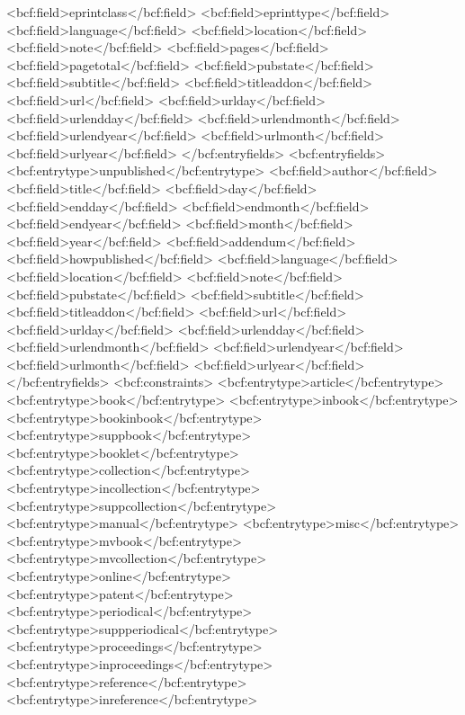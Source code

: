       <bcf:field>eprintclass</bcf:field>
      <bcf:field>eprinttype</bcf:field>
      <bcf:field>language</bcf:field>
      <bcf:field>location</bcf:field>
      <bcf:field>note</bcf:field>
      <bcf:field>pages</bcf:field>
      <bcf:field>pagetotal</bcf:field>
      <bcf:field>pubstate</bcf:field>
      <bcf:field>subtitle</bcf:field>
      <bcf:field>titleaddon</bcf:field>
      <bcf:field>url</bcf:field>
      <bcf:field>urlday</bcf:field>
      <bcf:field>urlendday</bcf:field>
      <bcf:field>urlendmonth</bcf:field>
      <bcf:field>urlendyear</bcf:field>
      <bcf:field>urlmonth</bcf:field>
      <bcf:field>urlyear</bcf:field>
    </bcf:entryfields>
    <bcf:entryfields>
      <bcf:entrytype>unpublished</bcf:entrytype>
      <bcf:field>author</bcf:field>
      <bcf:field>title</bcf:field>
      <bcf:field>day</bcf:field>
      <bcf:field>endday</bcf:field>
      <bcf:field>endmonth</bcf:field>
      <bcf:field>endyear</bcf:field>
      <bcf:field>month</bcf:field>
      <bcf:field>year</bcf:field>
      <bcf:field>addendum</bcf:field>
      <bcf:field>howpublished</bcf:field>
      <bcf:field>language</bcf:field>
      <bcf:field>location</bcf:field>
      <bcf:field>note</bcf:field>
      <bcf:field>pubstate</bcf:field>
      <bcf:field>subtitle</bcf:field>
      <bcf:field>titleaddon</bcf:field>
      <bcf:field>url</bcf:field>
      <bcf:field>urlday</bcf:field>
      <bcf:field>urlendday</bcf:field>
      <bcf:field>urlendmonth</bcf:field>
      <bcf:field>urlendyear</bcf:field>
      <bcf:field>urlmonth</bcf:field>
      <bcf:field>urlyear</bcf:field>
    </bcf:entryfields>
    <bcf:constraints>
      <bcf:entrytype>article</bcf:entrytype>
      <bcf:entrytype>book</bcf:entrytype>
      <bcf:entrytype>inbook</bcf:entrytype>
      <bcf:entrytype>bookinbook</bcf:entrytype>
      <bcf:entrytype>suppbook</bcf:entrytype>
      <bcf:entrytype>booklet</bcf:entrytype>
      <bcf:entrytype>collection</bcf:entrytype>
      <bcf:entrytype>incollection</bcf:entrytype>
      <bcf:entrytype>suppcollection</bcf:entrytype>
      <bcf:entrytype>manual</bcf:entrytype>
      <bcf:entrytype>misc</bcf:entrytype>
      <bcf:entrytype>mvbook</bcf:entrytype>
      <bcf:entrytype>mvcollection</bcf:entrytype>
      <bcf:entrytype>online</bcf:entrytype>
      <bcf:entrytype>patent</bcf:entrytype>
      <bcf:entrytype>periodical</bcf:entrytype>
      <bcf:entrytype>suppperiodical</bcf:entrytype>
      <bcf:entrytype>proceedings</bcf:entrytype>
      <bcf:entrytype>inproceedings</bcf:entrytype>
      <bcf:entrytype>reference</bcf:entrytype>
      <bcf:entrytype>inreference</bcf:entrytype>
